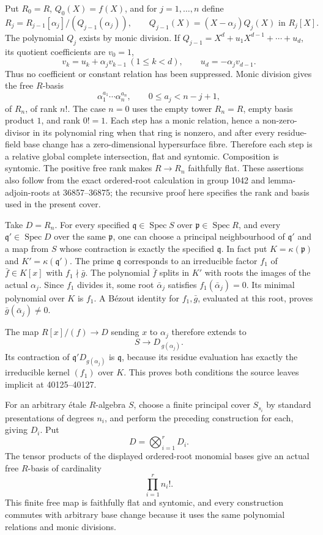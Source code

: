 Put \(R_0=R\), \(Q_0(X)=f(X)\), and for \(j=1,\ldots,n\) define \[
R_j=R_{j-1}[\alpha_j]/(Q_{j-1}(\alpha_j)),
\qquad
Q_{j-1}(X)=(X-\alpha_j)Q_j(X)\text{ in }R_j[X].
\] The polynomial \(Q_j\) exists by monic division. If \(Q_{j-1}=X^d+u_1X^{d-1}+\cdots+u_d\), its quotient coefficients are \(v_0=1\), \[
v_k=u_k+\alpha_jv_{k-1}\ (1\le k<d),
\qquad u_d=-\alpha_jv_{d-1}.
\] Thus no coefficient or constant relation has been suppressed. Monic division gives the free \(R\)-basis \[
\alpha_1^{a_1}\cdots\alpha_n^{a_n},
\qquad 0\le a_j<n-j+1,
\] of \(R_n\), of rank \(n!\). The case \(n=0\) uses the empty tower \(R_n=R\), empty basis product \(1\), and rank \(0!=1\). Each step has a monic relation, hence a non-zero-divisor in its polynomial ring when that ring is nonzero, and after every residue-field base change has a zero-dimensional hypersurface fibre. Therefore each step is a relative global complete intersection, flat and syntomic. Composition is syntomic. The positive free rank makes \(R\to R_n\) faithfully flat. These assertions also follow from the exact ordered-root calculation in group 1042 and lemma-adjoin-roots at 36857--36875; the recursive proof here specifies the rank and basis used in the present cover.

Take \(D=R_n\). For every specified \(\mathfrak q\in\operatorname{Spec}S\) over \(\mathfrak p\in\operatorname{Spec}R\), and every \(\mathfrak q'\in\operatorname{Spec}D\) over the same \(\mathfrak p\), one can choose a principal neighbourhood of \(\mathfrak q'\) and a map from \(S\) whose contraction is exactly the specified \(\mathfrak q\). In fact put \(K=\kappa(\mathfrak p)\) and \(K'=\kappa(\mathfrak q')\). The prime \(\mathfrak q\) corresponds to an irreducible factor \(f_1\) of \(\bar f\in K[x]\) with \(f_1\nmid\bar g\). The polynomial \(\bar f\) splits in \(K'\) with roots the images of the actual \(\alpha_j\). Since \(f_1\) divides it, some root \(\bar\alpha_j\) satisfies \(f_1(\bar\alpha_j)=0\). Its minimal polynomial over \(K\) is \(f_1\). A Bézout identity for \(f_1,\bar g\), evaluated at this root, proves \(\bar g(\bar\alpha_j)\ne0\).

The map \(R[x]/(f)\to D\) sending \(x\) to \(\alpha_j\) therefore extends to \[
S\longrightarrow D_{\,g(\alpha_j)}.
\] Its contraction of \(\mathfrak q'D_{g(\alpha_j)}\) is \(\mathfrak q\), because its residue evaluation has exactly the irreducible kernel \((f_1)\) over \(K\). This proves both conditions the source leaves implicit at 40125--40127.

For an arbitrary étale \(R\)-algebra \(S\), choose a finite principal cover \(S_{s_i}\) by standard presentations of degrees \(n_i\), and perform the preceding construction for each, giving \(D_i\). Put \[
D=\bigotimes_{i=1}^r D_i.
\] The tensor products of the displayed ordered-root monomial bases give an actual free \(R\)-basis of cardinality \[
\prod_{i=1}^r n_i!.
\] This finite free map is faithfully flat and syntomic, and every construction commutes with arbitrary base change because it uses the same polynomial relations and monic divisions.

